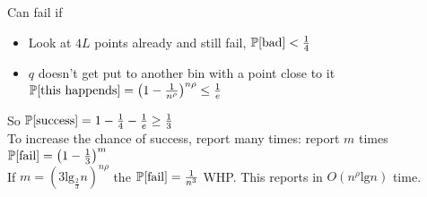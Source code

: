 \documentclass[12pt]{article}
\begin{document}
Can fail if 
\begin{itemize}
  \item Look at $4L$ points already and still fail, $\mathbb{P}\textrm{[bad]} < \frac{1}{4}$ 
  \item $q$ doesn't get put to another bin with a point close to it $\mathbb{P}\textrm{[this happends]} = \left( 1 - \frac{1}{n^\rho} \right)^{n\rho} \leq \frac{1}{e}$
\end{itemize}
So $\mathbb{P}\textrm{[success]} = 1 - \frac{1}{4} - \frac{1}{e} \geq \frac{1}{3}$\\
To increase the chance of success, report many times: report $m$ times $\mathbb{P}\textrm{[fail]} = \left( 1-\frac{1}{3}\right)^m$\\
If $m = (3\textrm{lg}_{\frac{2}{3}} n)^{n\rho}$ the $\mathbb{P}\textrm{[fail]}=\frac{1}{n^3}$ WHP. This reports in $O(n^\rho\textrm{lg}n)$ time.
\end{document}

